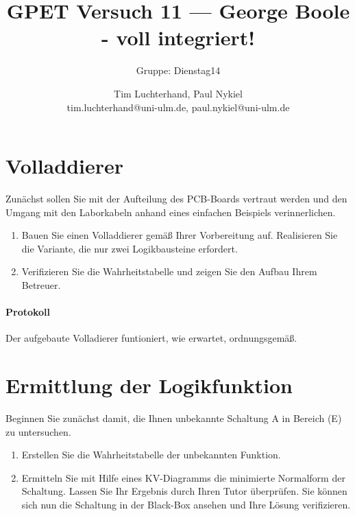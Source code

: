\documentclass[10pt]{scrreprt}
\author{Tim Luchterhand, Paul Nykiel \protect\\ tim.luchterhand@uni-ulm.de, paul.nykiel@uni-ulm.de}
\title{GPET Versuch 11 --- George Boole - voll integriert!}
\subtitle{Gruppe: Dienstag14}
\begin{document}
    \maketitle

    \section{Volladdierer}
    Zunächst sollen Sie mit der Aufteilung des PCB-Boards vertraut werden und den Umgang
    mit den Laborkabeln anhand eines einfachen Beispiels verinnerlichen.
    \begin{enumerate}
        \item Bauen Sie einen Volladdierer gemäß Ihrer Vorbereitung auf. Realisieren Sie die
            Variante, die nur zwei Logikbausteine erfordert.
        \item Verifizieren Sie die Wahrheitstabelle und zeigen Sie den Aufbau Ihrem Betreuer.
    \end{enumerate}

    \paragraph{Protokoll}
    Der aufgebaute Volladierer funtioniert, wie erwartet, ordnungsgemäß.

    \section{Ermittlung der Logikfunktion}
    Beginnen Sie zunächst damit, die Ihnen unbekannte Schaltung A in Bereich (E) zu
    untersuchen.
    \begin{enumerate}
        \item Erstellen Sie die Wahrheitstabelle der unbekannten Funktion.
        \item Ermitteln Sie mit Hilfe eines KV-Diagramms die minimierte Normalform der
            Schaltung. Lassen Sie Ihr Ergebnis durch Ihren Tutor überprüfen. Sie können sich nun
            die Schaltung in der Black-Box ansehen und Ihre Lösung verifizieren.
    \end{enumerate}
\end{document}
